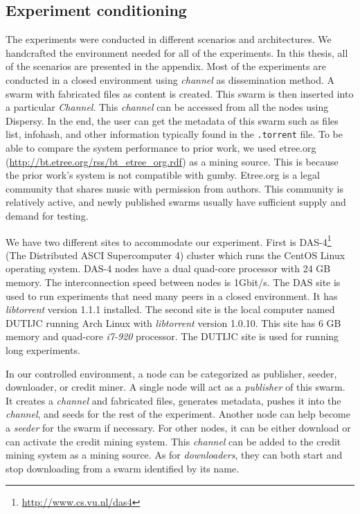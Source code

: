 \subsection{Experiment conditioning}
The experiments were conducted in different scenarios and architectures. We handcrafted the environment needed for all of the experiments. In this thesis, all of the scenarios are presented in the appendix. Most of the experiments are conducted in a closed environment using \textit{channel} as dissemination method. A swarm with fabricated files as content is created. This swarm is then inserted into a particular \textit{Channel}. This \textit{channel} can be accessed from all the nodes using Dispersy. In the end, the user can get the metadata of this swarm such as files list, infohash, and other information typically found in the \texttt{.torrent} file. To be able to compare the system performance to prior work, we used etree.org (\url{http://bt.etree.org/rss/bt_etree_org.rdf}) as a mining source. This is because the prior work's system is not compatible with gumby. Etree.org is a legal community that shares music with permission from authors. This community is relatively active, and newly published swarms usually have sufficient supply and demand for testing. 

We have two different sites to accommodate our experiment. First is DAS-4\footnote{\url{http://www.cs.vu.nl/das4}} (The Distributed ASCI Supercomputer 4) cluster which runs the CentOS Linux operating system. DAS-4 nodes have a dual quad-core processor with 24 GB memory. The interconnection speed between nodes is 1Gbit/s. The DAS site is used to run experiments that need many peers in a closed environment. It has \textit{libtorrent} version 1.1.1 installed. The second site is the local computer named DUTIJC running Arch Linux with \textit{libtorrent} version 1.0.10. This site has 6 GB memory and quad-core \textit{i7-920} processor. The DUTIJC site is used for running long experiments. 

In our controlled environment, a node can be categorized as publisher, seeder, downloader, or credit miner. A single node will act as a \textit{publisher} of this swarm. It creates a \textit{channel} and fabricated files, generates metadata, pushes it into the \textit{channel}, and seeds for the rest of the experiment. Another node can help become a \textit{seeder} for the swarm if necessary. For other nodes, it can be either download or can activate the credit mining system. This \textit{channel} can be added to the credit mining system as a mining source. As for \textit{downloaders}, they can both start and stop downloading from a swarm identified by its name. 

